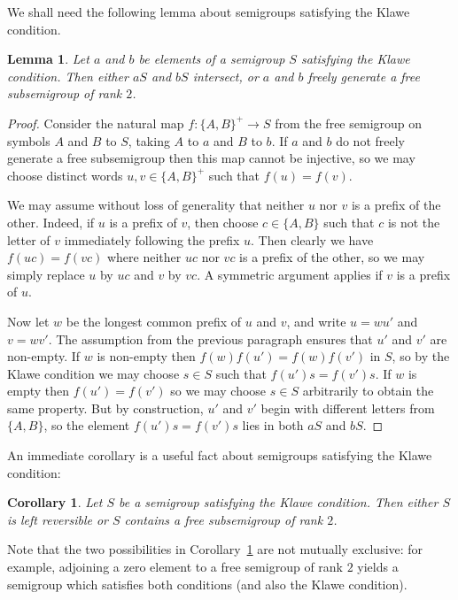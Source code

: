 \documentclass[11pt,a4paper,reqno]{amsart}
\newtheorem{lemma}[theorem]{Lemma}
\newtheorem{corollary}[theorem]{Corollary}
\begin{document}
We shall need the following lemma about semigroups satisfying the Klawe
condition.
\begin{lemma}
Let $a$ and $b$ be elements of a semigroup $S$ satisfying the Klawe
condition. Then either $aS$ and $bS$ intersect, or $a$ and $b$ freely
generate a free subsemigroup of rank $2$.
\end{lemma}
\begin{proof}
Consider the natural map
$f : \lbrace A,B \rbrace^+ \to S$ from the free semigroup on symbols
$A$ and $B$ to $S$, taking $A$ to $a$ and $B$ to $b$. If $a$ and $b$
do not freely generate a free subsemigroup then this map cannot be injective,
so we may choose distinct words $u,v \in \lbrace A,B \rbrace^+$ such
that $f(u)=f(v)$.

We may assume without loss of generality that
neither $u$ nor
$v$ is a prefix of the other. Indeed, if $u$ is a prefix of $v$, then choose
$c \in \lbrace A,B \rbrace$ such that $c$ is not the letter of $v$
immediately following the prefix $u$. Then clearly we have $f(uc) = f(vc)$
where neither $uc$ nor $vc$ is a prefix of the other, so we may simply replace
$u$ by $uc$ and $v$ by $vc$. A symmetric argument applies if $v$ is a prefix of
$u$.

Now let $w$ be the longest common prefix of $u$ and $v$, and write
$u = wu'$ and $v = wv'$. The assumption from the previous paragraph
ensures that $u'$ and $v'$ are non-empty. If $w$ is non-empty then $f(w) f(u') = f(w) f(v')$ in $S$, so
by the Klawe condition we may choose $s \in S$ such that $f(u') s = f(v') s$. If $w$ is
empty then $f(u') = f(v')$ so we may choose $s \in S$ arbitrarily to obtain the same property.
But by construction, $u'$ and $v'$ begin with different letters from
$\lbrace A,B \rbrace$, so the element $f(u')s = f(v')s$ lies in both $aS$ and $bS$.
\end{proof}

An immediate corollary is a useful fact about
semigroups satisfying the Klawe condition:
\begin{corollary}\label{cor_klawedichotomy}
Let $S$ be a semigroup satisfying the Klawe condition. Then either $S$
is left reversible or $S$ contains a free subsemigroup of rank $2$.
\end{corollary}
Note that the two possibilities in Corollary~\ref{cor_klawedichotomy}
are not mutually exclusive: for example, adjoining a zero element to a
free semigroup of rank $2$ yields a semigroup which satisfies both
conditions (and also the Klawe condition).
\end{document}
